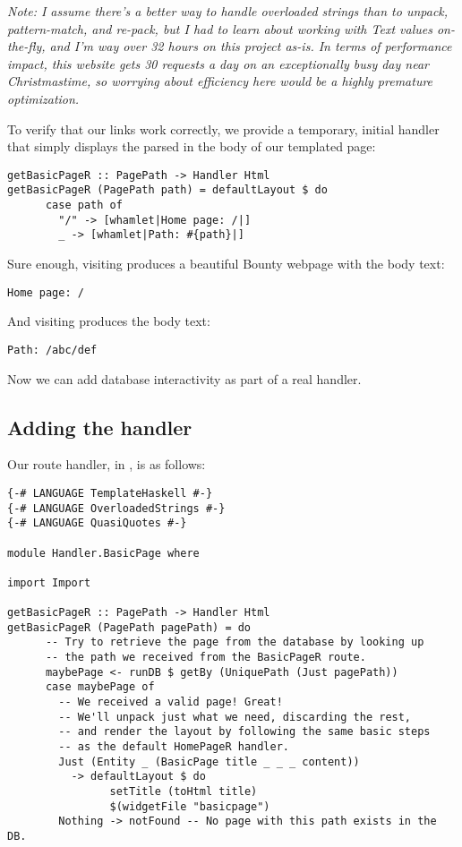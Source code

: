 \emph{Note: I assume there's a better way to handle overloaded strings than to unpack, pattern-match, and re-pack, but I had to learn about working with Text values on-the-fly, and I'm way over 32 hours on this project as-is. In terms of performance impact, this website gets 30 requests a day on an exceptionally busy day near Christmastime, so worrying about efficiency here would be a highly premature optimization.}

To verify that our links work correctly, we provide a temporary, initial handler that simply displays the parsed  in the body of our templated page:

\begin{Verbatim}
getBasicPageR :: PagePath -> Handler Html
getBasicPageR (PagePath path) = defaultLayout $ do
      case path of
        "/" -> [whamlet|Home page: /|]
        _ -> [whamlet|Path: #{path}|]
\end{Verbatim}

Sure enough, visiting  produces a beautiful Bounty webpage with the body text:

\begin{Verbatim}
Home page: /
\end{Verbatim}

And visiting  produces the body text:

\begin{Verbatim}
Path: /abc/def
\end{Verbatim}

Now we can add database interactivity as part of a real handler.

\subsection{Adding the handler}

Our route handler, in , is as follows:

\begin{Verbatim}
{-# LANGUAGE TemplateHaskell #-}
{-# LANGUAGE OverloadedStrings #-}
{-# LANGUAGE QuasiQuotes #-}

module Handler.BasicPage where

import Import

getBasicPageR :: PagePath -> Handler Html
getBasicPageR (PagePath pagePath) = do
      -- Try to retrieve the page from the database by looking up
      -- the path we received from the BasicPageR route.
      maybePage <- runDB $ getBy (UniquePath (Just pagePath))
      case maybePage of
        -- We received a valid page! Great!
        -- We'll unpack just what we need, discarding the rest,
        -- and render the layout by following the same basic steps
        -- as the default HomePageR handler.
        Just (Entity _ (BasicPage title _ _ _ content)) 
          -> defaultLayout $ do
                setTitle (toHtml title)
                $(widgetFile "basicpage")
        Nothing -> notFound -- No page with this path exists in the DB.
\end{Verbatim}

